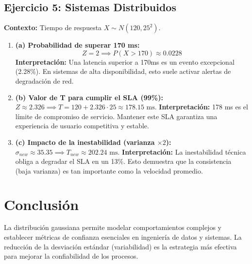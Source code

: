 \documentclass[a4paper,12pt]{article}
\begin{document}
\subsection{Ejercicio 5: Sistemas Distribuidos}
\textbf{Contexto:} Tiempo de respuesta $X \sim N(120, 25^2)$.

\begin{enumerate}
    \item \textbf{(a) Probabilidad de superar 170 ms:}
    \[ Z = 2 \implies P(X > 170) \approx 0.0228 \]
    \textcolor{interpretationcolor}{\textbf{Interpretación:} Una latencia superior a 170ms es un evento excepcional (2.28\%). En sistemas de alta disponibilidad, esto suele activar alertas de degradación de red.}

    \item \textbf{(b) Valor de T para cumplir el SLA (99\%):}
    $Z \approx 2.326 \implies T = 120 + 2.326 \cdot 25 \approx 178.15 \text{ ms}$.
    \textcolor{interpretationcolor}{\textbf{Interpretación:} 178 ms es el límite de compromiso de servicio. Mantener este SLA garantiza una experiencia de usuario competitiva y estable.}

    \item \textbf{(c) Impacto de la inestabilidad (varianza $\times 2$):}
    $\sigma_{new} \approx 35.35 \implies T_{new} \approx 202.24 \text{ ms}$.
    \textcolor{interpretationcolor}{\textbf{Interpretación:} La inestabilidad técnica obliga a degradar el SLA en un 13\%. Esto demuestra que la consistencia (baja varianza) es tan importante como la velocidad promedio.}
\end{enumerate}

\section{Conclusión}
La distribución gaussiana permite modelar comportamientos complejos y establecer métricas de confianza esenciales en ingeniería de datos y sistemas. La reducción de la desviación estándar (variabilidad) es la estrategia más efectiva para mejorar la confiabilidad de los procesos.
\end{document}
